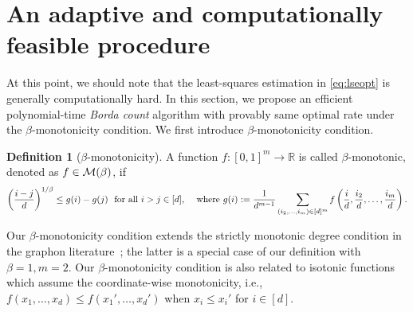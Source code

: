\documentclass{article}
\theoremstyle{definition}
\newtheorem{defn}{Definition}
\begin{document}

\section{An adaptive and computationally feasible procedure}\label{sec:borda}
At this point, we should note that the least-squares estimation in \eqref{eq:lseopt} is generally computationally hard. In this section, we propose an efficient polynomial-time \emph{Borda count} algorithm with provably same optimal rate under the $\beta$-monotonicity condition. We first introduce $\beta$-monotonicity condition.  
\begin{defn}[$\beta$-monotonicity]\label{eq:bdefn}
A function $f\colon[0,1]^m \rightarrow \mathbb{R}$ is called $\beta$-monotonic, denoted as $f\in\mathcal{M}(\beta)$, if 
\begin{align}\label{eq:monotonic}
    \left({i-j\over d}\right)^{1/\beta}\leq g(i)-g(j)\ \ \text{for all $i>j\in[d]$,} \quad \text{ where } g(i): = \frac{1}{d^{m-1}}\sum_{(i_2,\ldots,i_m)\in[d]^m} f\left({i\over d},{i_2\over d},\ldots,{i_m\over d}\right).
\end{align}
\end{defn}\vspace{-.3cm}
Our $\beta$-monotonicity condition extends the strictly monotonic degree condition in the graphon literature~\citep{chan2014consistent}; the latter is a special case of our definition with $\beta=1, m=2$. Our $\beta$-monotonicity condition is also related to isotonic functions~\citep{han2019isotonic,pananjady2020isotonic} which assume the coordinate-wise monotonicity, i.e., $f(x_1,\ldots,x_d)\leq f(x_1',\ldots,x_d')$
when $x_i\leq x_i'$ for $i\in[d]$. 
\end{document}
